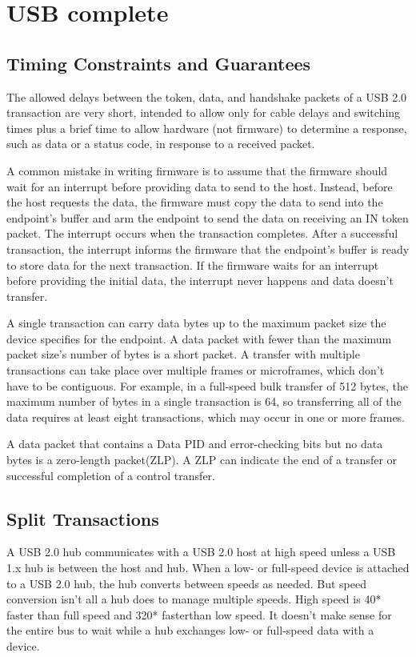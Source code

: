 
\chapter{USB complete}

\section{Timing Constraints and Guarantees}

The allowed delays between the token, data, and handshake packets of a USB
2.0 transaction are very short, intended to allow only for cable delays and
switching times plus a brief time to allow hardware (not firmware) to determine
a response, such as data or a status code, in response to a received packet.

A common mistake in writing firmware is to assume that the firmware should
wait for an interrupt before providing data to send to the host. Instead, before
the host requests the data, the firmware must copy the data to send into the
endpoint’s buffer and arm the endpoint to send the data on receiving an IN
token packet. The interrupt occurs when the transaction completes. After a successful transaction, the interrupt informs the firmware that the endpoint’s
buffer is ready to store data for the next transaction. If the firmware waits for an
interrupt before providing the initial data, the interrupt never happens and data
doesn’t transfer.

A single transaction can carry data bytes up to the maximum packet size the
device specifies for the endpoint. A data packet with fewer than the maximum
packet size’s number of bytes is a short packet. A transfer with multiple transactions can take place over multiple frames or microframes, which don’t have to
be contiguous. For example, in a full-speed bulk transfer of 512 bytes, the maximum number of bytes in a single transaction is 64, so transferring all of the
data requires at least eight transactions, which may occur in one or more
frames.

A data packet that contains a Data PID and error-checking bits but no data
bytes is a zero-length packet(ZLP). A ZLP can indicate the end of a transfer or
successful completion of a control transfer.
\section{Split Transactions}
A USB 2.0 hub communicates with a USB 2.0 host at high speed unless a USB
1.x hub is between the host and hub. When a low- or full-speed device is
attached to a USB 2.0 hub, the hub converts between speeds as needed. But
speed conversion isn’t all a hub does to manage multiple speeds. High speed is
40* faster than full speed and 320* fasterthan low speed. It doesn’t make sense
for the entire bus to wait while a hub exchanges low- or full-speed data with a
device.

